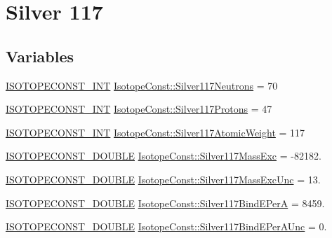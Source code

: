 \hypertarget{group___isotope_const-_silver-_ag117}{}\section{Silver 117}
\label{group___isotope_const-_silver-_ag117}
\subsection*{Variables}
\begin{DoxyCompactItemize}
\item 
\mbox{\hyperlink{group___isotope_const-_macros_ga5f18360b3e99483a35c32d789e62621c}{I\+S\+O\+T\+O\+P\+E\+C\+O\+N\+S\+T\+\_\+\+I\+NT}} \mbox{\hyperlink{group___isotope_const-_silver-_ag117_gae04a03564a0e2c5f1978a639260d0601}{Isotope\+Const\+::\+Silver117\+Neutrons}} = 70
\item 
\mbox{\hyperlink{group___isotope_const-_macros_ga5f18360b3e99483a35c32d789e62621c}{I\+S\+O\+T\+O\+P\+E\+C\+O\+N\+S\+T\+\_\+\+I\+NT}} \mbox{\hyperlink{group___isotope_const-_silver-_ag117_gaae5119ff7e534c0caa75e6166185b1e5}{Isotope\+Const\+::\+Silver117\+Protons}} = 47
\item 
\mbox{\hyperlink{group___isotope_const-_macros_ga5f18360b3e99483a35c32d789e62621c}{I\+S\+O\+T\+O\+P\+E\+C\+O\+N\+S\+T\+\_\+\+I\+NT}} \mbox{\hyperlink{group___isotope_const-_silver-_ag117_gab2b041732c11eeafd19e74a01cdc0497}{Isotope\+Const\+::\+Silver117\+Atomic\+Weight}} = 117
\item 
\mbox{\hyperlink{group___isotope_const-_macros_ga8f45a7272ce02c0b4c65c44636ed719a}{I\+S\+O\+T\+O\+P\+E\+C\+O\+N\+S\+T\+\_\+\+D\+O\+U\+B\+LE}} \mbox{\hyperlink{group___isotope_const-_silver-_ag117_gaa6eda562f8e6b817853c9b09aa3ece29}{Isotope\+Const\+::\+Silver117\+Mass\+Exc}} = -\/82182.
\item 
\mbox{\hyperlink{group___isotope_const-_macros_ga8f45a7272ce02c0b4c65c44636ed719a}{I\+S\+O\+T\+O\+P\+E\+C\+O\+N\+S\+T\+\_\+\+D\+O\+U\+B\+LE}} \mbox{\hyperlink{group___isotope_const-_silver-_ag117_ga45f99a708e8ebe9b740668ed630d2166}{Isotope\+Const\+::\+Silver117\+Mass\+Exc\+Unc}} = 13.
\item 
\mbox{\hyperlink{group___isotope_const-_macros_ga8f45a7272ce02c0b4c65c44636ed719a}{I\+S\+O\+T\+O\+P\+E\+C\+O\+N\+S\+T\+\_\+\+D\+O\+U\+B\+LE}} \mbox{\hyperlink{group___isotope_const-_silver-_ag117_ga0c9270baefeeee8f7f6b924771272193}{Isotope\+Const\+::\+Silver117\+Bind\+E\+PerA}} = 8459.
\item 
\mbox{\hyperlink{group___isotope_const-_macros_ga8f45a7272ce02c0b4c65c44636ed719a}{I\+S\+O\+T\+O\+P\+E\+C\+O\+N\+S\+T\+\_\+\+D\+O\+U\+B\+LE}} \mbox{\hyperlink{group___isotope_const-_silver-_ag117_ga7ec80b9c8200dc06a746eff6fad01e05}{Isotope\+Const\+::\+Silver117\+Bind\+E\+Per\+A\+Unc}} = 0.

\end{DoxyCompactItemize}
